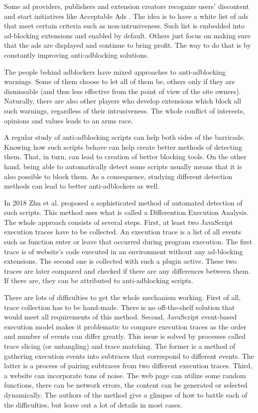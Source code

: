Some ad providers, publishers and extension creators recognize users' discontent 
and start initiatives like Acceptable Ads \cite{acceptableads}.
The idea is to have a white list of ads that meet certain criteria such as non-intrusiveness.
Such list is embedded into ad-blocking extensions and enabled by default.
Others just focus on making sure that the ads are displayed and continue to bring profit.
The way to do that is by constantly improving anti-adblocking solutions.

The people behind adblockers have mixed approaches to anti-adblocking warnings.
Some of them choose to let all of them be, others only if they are dismissable (and thus 
less effective from the point of view of the site owners). Naturally, there are also other 
players who develop extensions which block all such warnings, regardless of their
intrusiveness. The whole conflict of interests, opinions and values leads to an arms race.

A regular study of anti-adblocking scripts can help both sides of the barricade. Knowing how such scripts behave
can help create better methods of detecting them. That, in turn, can lead to creation of better blocking tools.
On the other hand, being able to automatically detect some scripts usually means that it is also possible
to block them. As a consequence, studying different detection methods can lead to better anti-adblockers as well.

In 2018 Zhu et al. \cite{DBLP:conf/ndss/ZhuHQSY18} proposed a sophisticated method 
of automated detection of such scripts. This method uses what is called a Differention Execution Analysis. 
The whole approach consists of several steps.
First, at least two JavaScript execution traces have to be collected. An execution trace is a list of all events such
as function enter or leave that occurred during program execution. The first trace is of website's code executed
in an environment without any ad-blocking extensions. The second one is collected with such a plugin active.
These two traces are later compared and checked if there are any differences between them.
If there are, they can be attributed to anti-adblocking scripts.

There are lots of difficulties to get the whole mechanism working. First of all, trace collection has
to be hand-made. There is no off-the-shelf solution that would meet all requirements of this method.
Second, JavaScript event-based execution model makes it problematic to compare execution traces
as the order and number of events can differ greatly. This issue is solved 
by processes called trace slicing (or untangling) and trace matching. The former is a method of gathering 
execution events into subtraces that correspond to different events. The latter is a process of
pairing subtraces from two different execution traces.
Third, a website can incorporate tons of noise. The web page can utilize some random functions, 
there can be network errors, the content can be generated or selected dynamically.
The authors of the method give a glimpse of how to battle each of the difficulties, 
but leave out a lot of details in most cases. 

